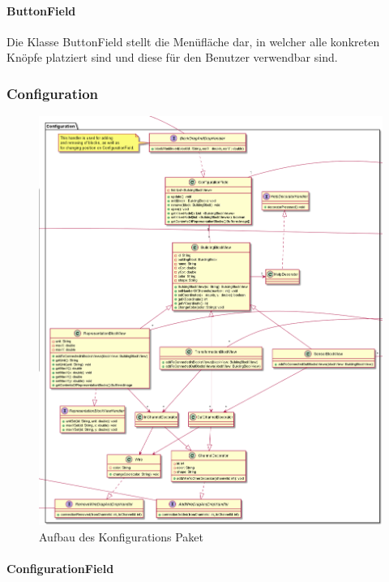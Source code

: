 \documentclass[parskip=full]{scrartcl}
\begin{document}
\paragraph{ButtonField}
Die Klasse ButtonField stellt die Menüfläche dar, in welcher alle konkreten Knöpfe platziert sind und diese für den Benutzer verwendbar sind.

\subsubsection{Configuration}

\begin{figure}[htbp]
	\begin{center}
		\includegraphics[width = 14cm]{Grafiken/View/ConfigurationNamespace.png}
		\caption{Aufbau des Konfigurations Paket}
		\label{Entwurf_Grob}
	\end{center}
\end{figure}


\paragraph{ConfigurationField}
\end{document}
